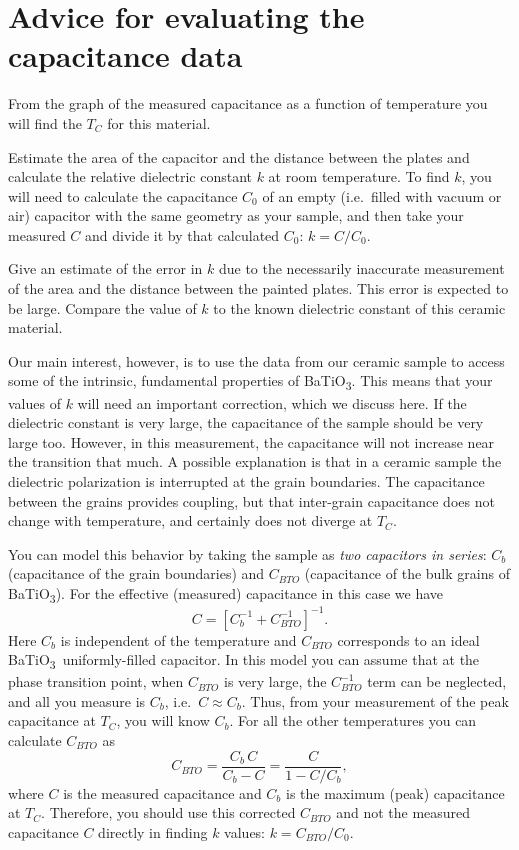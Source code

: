 \documentclass[11pt,a4paper]{article}
\newcommand{\BTO}{BaTiO\textsubscript{3}}
\begin{document}
\section{Advice for evaluating the capacitance data}\label{sec:advice}

From the graph of the measured capacitance as a function of temperature you will
find the $T_C$ for this material.

Estimate the area of the capacitor and the distance between the plates and
calculate the relative dielectric constant $k$ at room temperature. To find $k$,
you will need to calculate the capacitance $C_0$ of an empty (i.e.\ filled with
vacuum or air) capacitor with the same geometry as your sample, and then take
your measured $C$ and divide it by that calculated $C_0$: $k = C/C_0$.

Give an estimate of the error in $k$ due to the necessarily inaccurate
measurement of the area and the distance between the painted plates. This error
is expected to be large. Compare the value of $k$ to the known dielectric
constant of this ceramic material.

Our main interest, however, is to use the data from our ceramic sample to access
some of the intrinsic, fundamental properties of \BTO. This means that your
values of $k$ will need an important correction, which we discuss here. If the
dielectric constant is very large, the capacitance of the sample should be very
large too. However, in this measurement, the capacitance will not increase near
the transition that much. A possible explanation is that in a ceramic sample the
dielectric polarization is interrupted at the grain boundaries. The capacitance
between the grains provides coupling, but that inter-grain capacitance does not
change with temperature, and certainly does not diverge at $T_C$.

You can model this behavior by taking the sample as \emph{two capacitors in
series}: $C_b$ (capacitance of the grain boundaries) and $C_{BTO}$ (capacitance
of the bulk grains of \BTO). For the effective (measured) capacitance
in this case we have
\begin{equation}
  C = \left[C_b^{-1} + C_{BTO}^{-1}\right]^{-1}.
\end{equation}
Here $C_b$ is independent of the temperature and $C_{BTO}$ corresponds to an
ideal \BTO\ uniformly-filled capacitor. In this model you can assume that at the phase transition
point, when $C_{BTO}$ is very large, the $C_{BTO}^{-1}$ term can be neglected,
and all you measure is $C_b$, i.e.\ $C \approx C_b$. Thus, from your measurement
of the peak capacitance at $T_C$, you will know $C_b$. For all the other
temperatures you can calculate $C_{BTO}$ as
\begin{equation}\label{eq:CBTO}
  C_{BTO} = \frac{C_b\,C}{C_b - C} = \frac{C}{1 - C/C_b},
\end{equation}
where $C$ is the measured capacitance and $C_b$ is the maximum (peak)
capacitance at $T_C$. Therefore, you should use this corrected $C_{BTO}$ and not
the measured capacitance $C$ directly in finding $k$ values: $k = C_{BTO}/C_0$.
\end{document}
